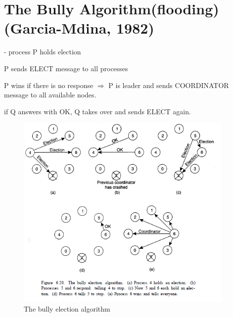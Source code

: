 \section{The Bully Algorithm(flooding) (Garcia-Mdina, 1982)}
- process P holds election
\begin{compactenum}
\item P sends ELECT message to all processes
\item P wins if there is no response $\Rightarrow$ P is leader and sends COORDINATOR message to all available nodes.
\item if Q answers with OK, Q takes over and sends ELECT again.
\end{compactenum}
\begin{figure}[h]
	\centering
	\includegraphics[width=400px]{gfx/leader1.png}
	\caption{The bully election algorithm}
	\label{img:leader1}
\end{figure}


